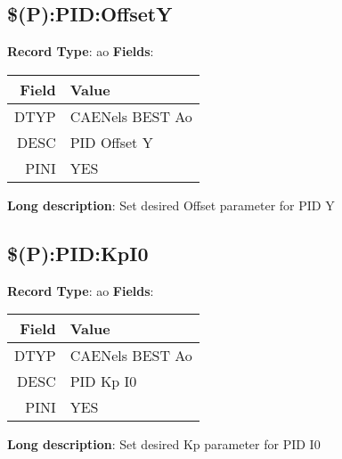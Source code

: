 \subsection{\$(P):PID:OffsetY}
\textbf{Record Type}: ao \newline \newline 
\textbf{Fields}: \newline 
\begin{tabularx}{0.7\linewidth}{|r|X|}
\hline Field & Value \\
\hline
\hline
DTYP & CAENels BEST Ao\\
\hline
DESC & PID Offset Y\\
\hline
PINI & YES\\
\hline
\end{tabularx}
\newline \newline \newline
\textbf{Long description}: \newline 
 Set desired Offset parameter for PID Y
\newline \newline


\subsection{\$(P):PID:KpI0}
\textbf{Record Type}: ao \newline \newline 
\textbf{Fields}: \newline 
\begin{tabularx}{0.7\linewidth}{|r|X|}
\hline Field & Value \\
\hline
\hline
DTYP & CAENels BEST Ao\\
\hline
DESC & PID Kp I0\\
\hline
PINI & YES\\
\hline
\end{tabularx}
\newline \newline \newline
\textbf{Long description}: \newline 
 Set desired Kp parameter for PID I0
\newline \newline

